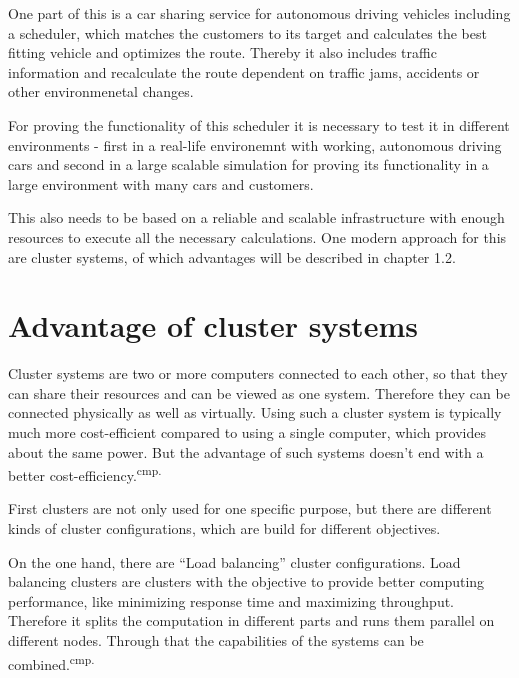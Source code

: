 
One part of this is a car sharing service for autonomous driving vehicles including a scheduler, which matches the customers to its target and calculates the best fitting vehicle and optimizes the route. Thereby it also includes traffic information and recalculate the route dependent on traffic jams, accidents or other environmenetal changes.

For proving the functionality of this scheduler it is necessary to test it in different environments - first in a real-life environemnt with working, autonomous driving cars and second in a large scalable simulation for proving its functionality in a large environment with many cars and customers.

This also needs to be based on a reliable and scalable infrastructure with enough resources to execute all the necessary calculations. One modern approach for this are cluster systems, of which advantages will be described in chapter 1.2.


\section{Advantage of cluster systems}

Cluster systems are two or more computers connected to each other, so that they can share their resources and can be viewed as one system. Therefore they can be connected physically as well as virtually. Using such a cluster system is typically much more cost-efficient compared to using a single computer, which provides about the same power. But the advantage of such systems doesn't end with a better cost-efficiency.\textsuperscript{cmp.\cite{1}}


First clusters are not only used for one specific purpose, but there are different kinds of cluster configurations, which are build for different objectives.

On the one hand, there are ``Load balancing'' cluster configurations. Load balancing clusters are clusters with the objective to provide better computing performance, like minimizing response time and maximizing throughput.  Therefore it splits the computation in different parts and runs them parallel on different nodes. Through that the capabilities of the systems can be combined.\textsuperscript{cmp.\cite{2}}

